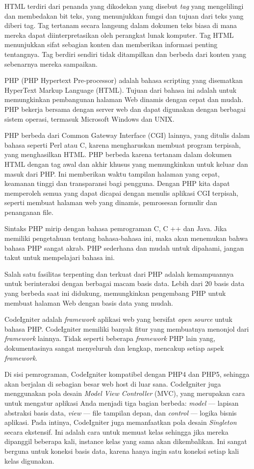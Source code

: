 \documentclass[a4paper,twoside]{article}
\begin{document}
\begin{enumerate}
HTML terdiri dari penanda yang dikodekan yang disebut \textit{tag} yang mengelilingi dan membedakan bit teks, yang menunjukkan fungsi dan tujuan dari teks yang diberi tag. Tag tertanam secara langsung dalam dokumen teks biasa di mana mereka dapat diinterpretasikan oleh perangkat lunak komputer. Tag HTML menunjukkan sifat sebagian konten dan memberikan informasi penting tentangnya. Tag berdiri sendiri tidak ditampilkan dan berbeda dari konten yang sebenarnya mereka sampaikan.

PHP (PHP Hypertext Pre-processor) adalah bahasa scripting yang disematkan HyperText Markup Language (HTML). Tujuan dari bahasa ini adalah untuk memungkinkan pembangunan halaman Web dinamis dengan cepat dan mudah. PHP bekerja bersama dengan server web dan dapat digunakan dengan berbagai sistem operasi, termasuk Microsoft Windows dan UNIX.

PHP berbeda dari Common Gateway Interface (CGI) lainnya, yang ditulis dalam bahasa seperti Perl atau C, karena mengharuskan membuat program terpisah, yang menghasilkan HTML. PHP berbeda karena tertanam dalam dokumen HTML dengan tag awal dan akhir khusus yang memungkinkan untuk keluar dan masuk dari PHP. Ini memberikan waktu tampilan halaman yang cepat, keamanan tinggi dan transparansi bagi pengguna. Dengan PHP kita dapat memperoleh semua yang dapat dicapai dengan menulis aplikasi CGI terpisah, seperti membuat halaman web yang dinamis, pemrosesan formulir dan penanganan file.

Sintaks PHP mirip dengan bahasa pemrograman C, C ++ dan Java. Jika  memiliki pengetahuan tentang bahasa-bahasa ini, maka akan menemukan bahwa bahasa PHP sangat akrab. PHP sederhana dan mudah untuk dipahami, jangan takut untuk mempelajari bahasa ini.

Salah satu fasilitas terpenting dan terkuat dari PHP adalah kemampuannya untuk berinteraksi dengan berbagai macam basis data. Lebih dari 20 basis data yang berbeda saat ini didukung, memungkinkan pengembang PHP untuk membuat halaman Web dengan basis data yang mudah. 

CodeIgniter adalah \textit{framework} aplikasi web yang bersifat \textit{open source} untuk bahasa PHP. CodeIgniter memiliki banyak fitur yang membuatnya menonjol dari \textit{framework} lainnya. Tidak seperti beberapa \textit{framework} PHP lain yang, dokumentasinya sangat menyeluruh dan lengkap, mencakup setiap aspek \textit{framework}. 

Di sisi pemrograman, CodeIgniter kompatibel dengan PHP4 dan PHP5, sehingga akan berjalan di sebagian besar web host di luar sana. CodeIgniter juga menggunakan pola desain \textit{Model View Controller} (MVC), yang merupakan cara untuk mengatur aplikasi Anda menjadi tiga bagian berbeda: \textit{model} — lapisan abstraksi basis data, \textit{view} — file tampilan depan, dan \textit{control} — logika bisnis aplikasi. Pada intinya, CodeIgniter juga memanfaatkan pola desain \textit{Singleton} secara ekstensif. Ini adalah cara untuk memuat kelas sehingga jika mereka dipanggil beberapa kali, instance kelas yang sama akan dikembalikan. Ini sangat berguna untuk koneksi basis data, karena hanya ingin satu koneksi setiap kali kelas digunakan.



\end{enumerate}
\end{document}
